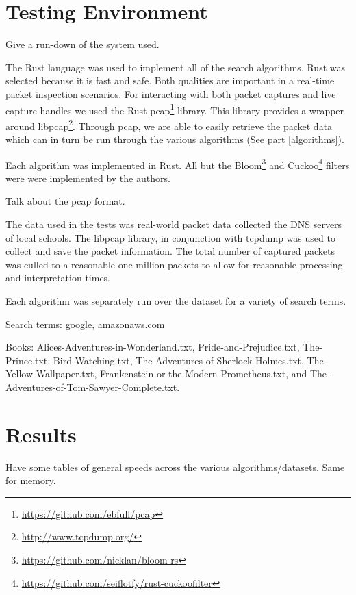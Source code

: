 \documentclass{article}
\begin{document}
\section{Testing Environment}	
Give a run-down of the system used.

The Rust language was used to implement all of the search algorithms. Rust was selected because it is fast and safe. Both  qualities are important in a real-time packet inspection scenarios. For interacting with both packet captures and live capture handles we used the Rust pcap\footnote{\url{https://github.com/ebfull/pcap}} library. This library provides a wrapper around libpcap\footnote{\url{http://www.tcpdump.org/}}. Through pcap, we are able to easily retrieve the packet data which can in turn be run through the various algorithms (See part \ref{algorithms}).

Each algorithm was implemented in Rust. All but the Bloom\footnote{\url{https://github.com/nicklan/bloom-rs}} \cite{Bloom1970} and Cuckoo\footnote{\url{https://github.com/seiflotfy/rust-cuckoofilter}} \cite{Fan2014} filters were were implemented by the authors.

Talk about the pcap format.

The data used in the tests was real-world packet data collected the DNS servers of local schools. The libpcap library, in conjunction with tcpdump was used to collect and save the packet information. The total number of captured packets was culled to a reasonable one million packets to allow for reasonable processing and interpretation times.

Each algorithm was separately run over the dataset for a variety of search terms.

Search terms: google, amazonaws.com

Books: Alices-Adventures-in-Wonderland.txt, Pride-and-Prejudice.txt, The-Prince.txt, Bird-Watching.txt, The-Adventures-of-Sherlock-Holmes.txt, The-Yellow-Wallpaper.txt, Frankenstein-or-the-Modern-Prometheus.txt, and The-Adventures-of-Tom-Sawyer-Complete.txt.

\section{Results}
Have some tables of general speeds across the various algorithms/datasets. Same for memory.
\end{document}
